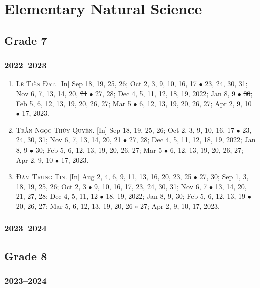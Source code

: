 \documentclass{article}
\begin{document}
\section{Elementary Natural Science}

\subsection{Grade 7}

\subsubsection{2022--2023}

\begin{enumerate}
	\item \textsc{Lê Tiến Đạt.} \textsf{[In]} Sep 18, 19, 25, 26; Oct 2, 3, 9, 10, 16, 17 $\bullet$ 23, 24, 30, 31; Nov 6, 7, 13, 14, 20, \st{21} $\bullet$ 27, 28; Dec 4, 5, 11, 12, 18, 19, 2022; Jan 8, 9 $\bullet$ \st{30}; Feb 5, 6, 12, 13, 19, 20, 26, 27; Mar 5 $\bullet$ 6, 12, 13, 19, 20, 26, 27; Apr 2, 9, 10 $\bullet$ 17, 2023.
	\item \textsc{Trần Ngọc Thúy Quyên.} \textsf{[In]} Sep 18, 19, 25, 26; Oct 2, 3, 9, 10, 16, 17 $\bullet$ 23, 24, 30, 31; Nov 6, 7, 13, 14, 20, 21 $\bullet$ 27, 28; Dec 4, 5, 11, 12, 18, 19, 2022; Jan 8, 9 $\bullet$ 30; Feb 5, 6, 12, 13, 19, 20, 26, 27; Mar 5 $\bullet$ 6, 12, 13, 19, 20, 26, 27; Apr 2, 9, 10 $\bullet$ 17, 2023.
	\item \textsc{Đàm Trung Tín.} \textsf{[In]} Aug 2, 4, 6, 9, 11, 13, 16, 20, 23, 25 $\bullet$ 27, 30; Sep 1, 3, 18, 19, 25, 26; Oct 2, 3 $\bullet$ 9, 10, 16, 17, 23, 24, 30, 31; Nov 6, 7 $\bullet$ 13, 14, 20, 21, 27, 28; Dec 4, 5, 11, 12 $\bullet$ 18, 19, 2022; Jan 8, 9, 30; Feb 5, 6, 12, 13, 19 $\bullet$ 20, 26, 27; Mar 5, 6, 12, 13, 19, 20, 26 $\circ$ 27; Apr 2, 9, 10, 17, 2023.
\end{enumerate}

\subsubsection{2023--2024}

\subsection{Grade 8}

\subsubsection{2023--2024}
\end{document}

